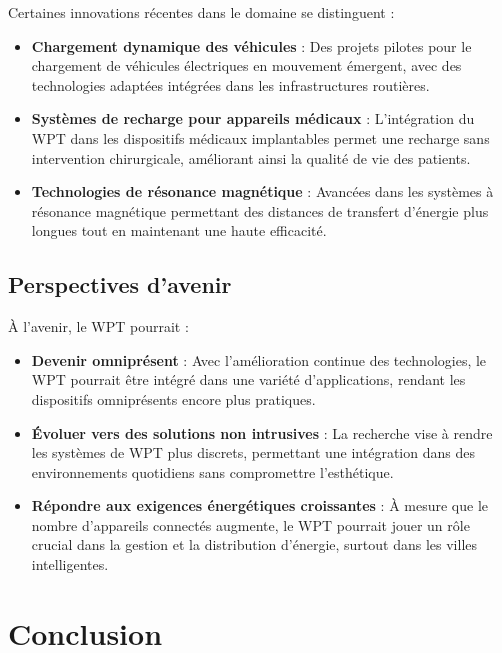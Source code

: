 \documentclass[12pt,a4paper,titlepage,notitlepage]{article}
\begin{document}
	Certaines innovations récentes dans le domaine se distinguent :
	\begin{itemize}
		\item \textbf{Chargement dynamique des véhicules} : Des projets pilotes pour le chargement de véhicules électriques en mouvement émergent, avec des technologies adaptées intégrées dans les infrastructures routières.
		\item \textbf{Systèmes de recharge pour appareils médicaux} : L'intégration du WPT dans les dispositifs médicaux implantables permet une recharge sans intervention chirurgicale, améliorant ainsi la qualité de vie des patients.
		\item \textbf{Technologies de résonance magnétique} : Avancées dans les systèmes à résonance magnétique permettant des distances de transfert d'énergie plus longues tout en maintenant une haute efficacité.
	\end{itemize}
	
	\subsection{Perspectives d'avenir}
	
	À l'avenir, le WPT pourrait :
	\begin{itemize}
		\item \textbf{Devenir omniprésent} : Avec l'amélioration continue des technologies, le WPT pourrait être intégré dans une variété d'applications, rendant les dispositifs omniprésents encore plus pratiques.
		\item \textbf{Évoluer vers des solutions non intrusives} : La recherche vise à rendre les systèmes de WPT plus discrets, permettant une intégration dans des environnements quotidiens sans compromettre l'esthétique.
		\item \textbf{Répondre aux exigences énergétiques croissantes} : À mesure que le nombre d'appareils connectés augmente, le WPT pourrait jouer un rôle crucial dans la gestion et la distribution d'énergie, surtout dans les villes intelligentes.
	\end{itemize}
	
	\newpage
	\section{Conclusion}
	
	
	
	
	

	
	\newpage
\end{document}
